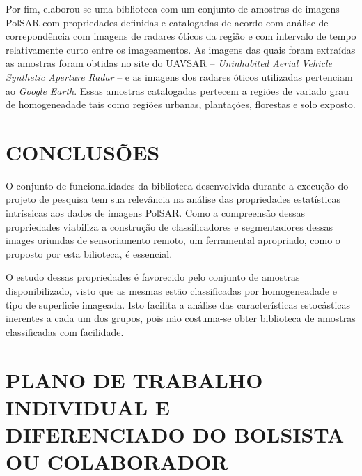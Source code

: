 \documentclass[12pt,letterpaper]{article}
\begin{document}
Por fim, elaborou-se uma biblioteca com um conjunto de amostras de imagens PolSAR com propriedades definidas e catalogadas de acordo com análise de correpondência com imagens de radares óticos da região e com intervalo de tempo relativamente curto entre os imageamentos. As imagens das quais foram extraídas as amostras foram obtidas no site do UAVSAR -- \textit{Uninhabited Aerial Vehicle Synthetic Aperture Radar} -- e as imagens dos radares óticos utilizadas pertenciam ao \textit{Google Earth}. Essas amostras catalogadas pertecem a regiões de variado grau de homogeneadade tais como regiões urbanas, plantações, florestas e solo exposto.

  
  \newpage
\section*{\centering \textbf{CONCLUSÕES}} %

O conjunto de funcionalidades da biblioteca desenvolvida durante a execução do projeto de pesquisa tem sua relevância na análise das propriedades estatísticas intríssicas aos dados de imagens PolSAR. Como a compreensão dessas propriedades viabiliza a construção de classificadores e segmentadores dessas images oriundas de sensoriamento remoto, um ferramental apropriado, como o proposto por esta bilioteca, é essencial.

O estudo dessas propriedades é favorecido pelo conjunto de amostras disponibilizado, visto que as mesmas estão classificadas por homogeneadade e tipo de superficie imageada. Isto facilita a análise das características estocásticas inerentes a cada um dos grupos, pois não costuma-se obter biblioteca de amostras classificadas com facilidade.

  
\newpage

\begin{center}



\end{center}

  
  \newpage

\section*{\centering \textbf{PLANO DE TRABALHO INDIVIDUAL E DIFERENCIADO DO BOLSISTA OU COLABORADOR}} %
\end{document}

